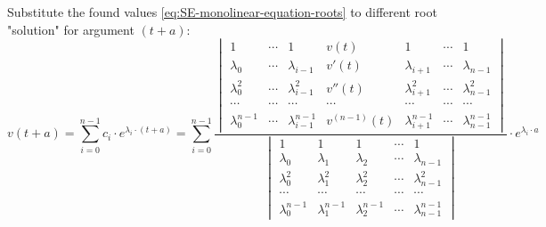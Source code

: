 \documentclass[a4paper, 11pt, oneside]{book}
\begin{document}
Substitute the found values \ref{eq:SE-monolinear-equation-roots} to different root "solution" for argument $(t + a)$:
\begin{equation}\label{eq:monolinear-equation-solution}
  v(t + a) = \sum_{i=0}^{n-1} c_i \cdot e^{\lambda_i \cdot (t + a)} = \sum_{i=0}^{n-1}
  \frac{
  \begin{vmatrix}
    1 & \cdots & 1 & v(t) & 1 & \cdots & 1 \\
    \lambda_0 & \cdots & \lambda_{i-1} & v'(t) & \lambda_{i+1} & \cdots & \lambda_{n-1} \\
    \lambda_0^2 & \cdots & \lambda_{i-1}^2 & v''(t) & \lambda_{i+1}^2 & \cdots & \lambda_{n-1}^2 \\
    \cdots & \cdots & \cdots & \cdots & \cdots & \cdots & \cdots \\
    \lambda_0^{n-1} & \cdots & \lambda_{i-1}^{n-1} & v^{(n-1)}(t) & \lambda_{i+1}^{n-1} & \cdots & \lambda_{n-1}^{n-1}
  \end{vmatrix}
  }{
  \begin{vmatrix}
    1 & 1 & 1 & \cdots & 1 \\
    \lambda_0 & \lambda_1 & \lambda_2 & \cdots & \lambda_{n-1} \\
    \lambda_0^2 & \lambda_1^2 & \lambda_2^2 & \cdots & \lambda_{n-1}^2 \\
    \cdots & \cdots & \cdots & \cdots & \cdots \\
    \lambda_0^{n-1} & \lambda_1^{n-1} & \lambda_2^{n-1} & \cdots & \lambda_{n-1}^{n-1}
  \end{vmatrix}
  }
  \cdot e^{\lambda_i \cdot a}
\end{equation}
\end{document}
